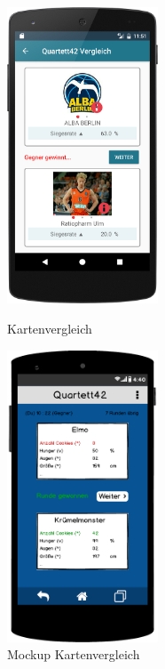 \begin{figure}[h]
    \centering
    \begin{minipage}{0.49\textwidth}
        \centering
        \includegraphics[width=0.4\textwidth]{img/screenshots/device_comparison.png}
		\caption{Kartenvergleich}
		\label{figure:implementierungspiel2}    
	\end{minipage}
    \begin{minipage}{0.49\textwidth}
        \centering
        \includegraphics[width=0.4\textwidth]{img/mockups/spiel_vergleich.png}
        \caption{Mockup Kartenvergleich}
    \end{minipage}
\end{figure}


